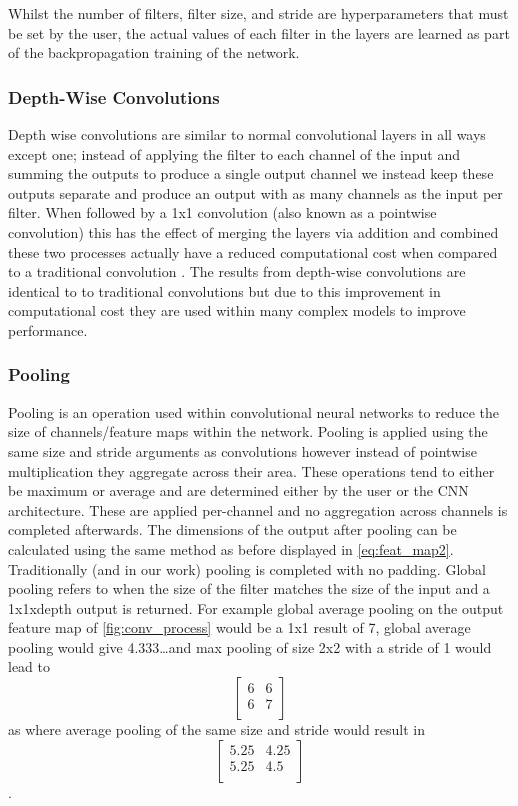 \documentclass[12pt]{article}
\numberwithin{equation}{section}
\numberwithin{figure}{section}
\begin{document}
Whilst the number of filters, filter size, and stride are hyperparameters that must be set by the user, the actual values of each filter in the layers are learned as part of the backpropagation training of the network.


\subsubsection{Depth-Wise Convolutions}
Depth wise convolutions are similar to normal convolutional layers in all ways except one; instead of applying the filter to each channel of the input and summing the outputs to produce a single output channel we instead keep these outputs separate and produce an output with as many channels as the input per filter.  When followed by a 1x1 convolution (also known as a pointwise convolution) this has the effect of merging the layers via addition and combined these two processes actually have a reduced computational cost when compared to a traditional convolution \cite{Sandler2018}. The results from depth-wise convolutions are identical to to traditional convolutions but due to this improvement in computational cost they are used within many complex models to improve performance. 

\subsubsection{Pooling}
Pooling is an operation used within convolutional neural networks to reduce the size of channels/feature maps within the network. Pooling is applied using the same size and stride arguments as convolutions however instead of pointwise multiplication they aggregate across their area. These operations tend to either be maximum or average and are determined either by the user or the CNN architecture. These are applied per-channel and no aggregation across channels is completed afterwards. The dimensions of the output after pooling can be calculated using the same method as before displayed in \cref{eq:feat_map2}. Traditionally (and in our work) pooling is completed with no padding. Global pooling refers to when the size of the filter matches the size of the input and a 1x1xdepth output is returned. For example global average pooling on the output feature map of \cref{fig:conv_process} would be a 1x1 result of 7, global average pooling would give 4.333\dots and max pooling of size 2x2 with a stride of 1 would lead to
$$
\begin{bmatrix}
	6 & 6 \\
	6 & 7 \\
\end{bmatrix}
$$
as where average pooling of the same size and stride would result in
$$
\begin{bmatrix}
	5.25 & 4.25 \\
	5.25 & 4.5 \\
\end{bmatrix}
$$.
\end{document}
